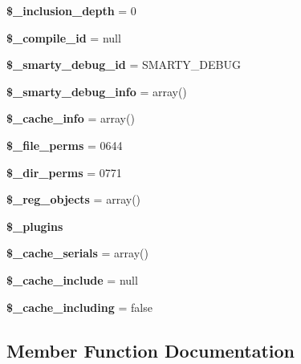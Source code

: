 \begin{DoxyCompactItemize}
\mbox{\label{class_smarty_a6167b63640563df2374a677f4ed41641}} 
{\bfseries \$\+\_\+inclusion\+\_\+depth} = 0
\item 
\mbox{\label{class_smarty_ac327b0792184db847b78cae7da804eba}} 
{\bfseries \$\+\_\+compile\+\_\+id} = null
\item 
\mbox{\label{class_smarty_a39de745821c96537c5f36d79120e1413}} 
{\bfseries \$\+\_\+smarty\+\_\+debug\+\_\+id} = \textquotesingle{}S\+M\+A\+R\+T\+Y\+\_\+\+D\+E\+B\+UG\textquotesingle{}
\item 
\mbox{\label{class_smarty_a751873e7923220e5351800cc29fef3b3}} 
{\bfseries \$\+\_\+smarty\+\_\+debug\+\_\+info} = array()
\item 
\mbox{\label{class_smarty_acf32b5dd8fecc400d48e7452b5ec5640}} 
{\bfseries \$\+\_\+cache\+\_\+info} = array()
\item 
\mbox{\label{class_smarty_affa1e29315f40fe30ea516c7e8f2430e}} 
{\bfseries \$\+\_\+file\+\_\+perms} = 0644
\item 
\mbox{\label{class_smarty_a917cec287e9c00b1c188e4a815b279b2}} 
{\bfseries \$\+\_\+dir\+\_\+perms} = 0771
\item 
\mbox{\label{class_smarty_a89d5e48a4a6c2e53471a755ff63acb69}} 
{\bfseries \$\+\_\+reg\+\_\+objects} = array()
\item 
{\bfseries \$\+\_\+plugins}
\item 
\mbox{\label{class_smarty_a0a5b5d0884aa98c7f7135d3aba17f578}} 
{\bfseries \$\+\_\+cache\+\_\+serials} = array()
\item 
\mbox{\label{class_smarty_a7f51c31864e6e5241313a2102dd32808}} 
{\bfseries \$\+\_\+cache\+\_\+include} = null
\item 
\mbox{\label{class_smarty_a1fbc7764bc21f54adbe1ee17d9c72115}} 
{\bfseries \$\+\_\+cache\+\_\+including} = false
\end{DoxyCompactItemize}


\subsection{Member Function Documentation}
\mbox{\label{class_smarty_af0c22913faf4ec5e6d8674c643c69cc5}} 
